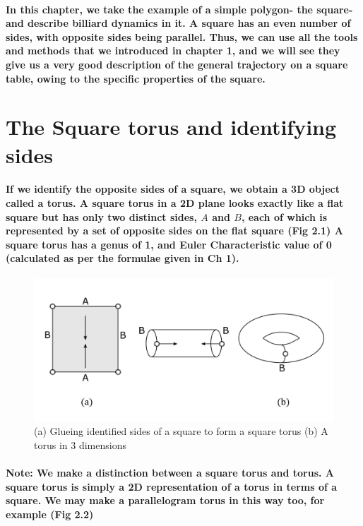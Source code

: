 \documentclass{report}
\begin{document}
\paragraph{In this chapter, we take the example of a simple polygon- the square- and describe billiard dynamics in it. A square has an even number of sides, with opposite sides being parallel. Thus, we can use all the tools and methods that we introduced in chapter 1, and we will see they give us a very good description of the general trajectory on a square table, owing to the specific properties of the square.}

\section{The Square torus and identifying sides}

\paragraph{If we identify the opposite sides of a square, we obtain a 3D object called a torus. A square torus in a 2D plane looks exactly like a flat square but has only two distinct sides, $A$ and $B$, each of which is represented by a set of opposite sides on the flat square (Fig 2.1) A square torus has a genus of 1, and Euler Characteristic value of 0 (calculated as per the formulae given in Ch 1).}

\begin{figure}[h]
\begin{center}
\includegraphics[scale=0.3]{2.1}
\caption{(a) Glueing identified sides of a square to form a square torus (b) A torus in 3 dimensions}
\end{center}
\end{figure}

\pagebreak


\paragraph{Note: We make a distinction between a square torus and  torus. A square torus is simply a 2D representation of a torus in terms of a square. We may make a parallelogram torus in this way too, for example (Fig 2.2)}
\end{document}
